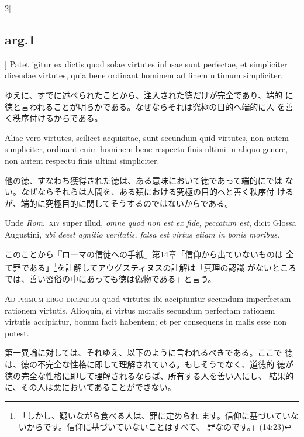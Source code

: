 \documentclass[paper=a4paper,fontsize=10pt,jafontsize=9pt,titlepage]{jlreq}
\begin{document}
\begin{paracol}{2}[\subsection{arg.1}]
Patet igitur ex dictis quod solae virtutes infusae sunt perfectae, et
 simpliciter dicendae virtutes, quia bene ordinant hominem ad finem
 ultimum simpliciter.

\switchcolumn

ゆえに、すでに述べられたことから、注入された徳だけが完全であり、端的
 に徳と言われることが明らかである。なぜならそれは究極の目的へ端的に人
 を善く秩序付けるからである。

\switchcolumn*

Aliae vero virtutes, scilicet acquisitae, sunt secundum quid
 virtutes, non autem simpliciter, ordinant enim hominem bene respectu
 finis ultimi in aliquo genere, non autem respectu finis ultimi
 simpliciter.

\switchcolumn

他の徳、すなわち獲得された徳は、ある意味において徳であって端的にでは
 ない。なぜならそれらは人間を、ある類における究極の目的へと善く秩序付
 けるが、端的に究極目的に関してそうするのではないからである。

\switchcolumn*

Unde {\itshape Rom}.~{\scshape xiv} super illud, {\itshape omne quod
 non est ex fide, peccatum est}, dicit Glossa Augustini, {\itshape ubi
 deest agnitio veritatis, falsa est virtus etiam in bonis moribus}.

\switchcolumn

このことから『ローマの信徒への手紙』第14章「信仰から出ていないものは
 全て罪である」\footnote{「しかし、疑いながら食べる人は、罪に定められ
 ます。信仰に基づいていないからです。信仰に基づいていないことはすべて、
 罪なのです。」(14:23)}を註解してアウグスティヌスの註解は「真理の認識
 がないところでは、善い習俗の中にあっても徳は偽物である」と言う。

\switchcolumn*[\subsection{ad.1}]

{\scshape Ad primum ergo dicendum} quod virtutes ibi accipiuntur
 secundum imperfectam rationem virtutis. Alioquin, si virtus moralis
 secundum perfectam rationem virtutis accipiatur, bonum facit
 habentem; et per consequens in malis esse non potest.

\switchcolumn

第一異論に対しては、それゆえ、以下のように言われるべきである。ここで
 徳は、徳の不完全な性格に即して理解されている。もしそうでなく、道徳的
 徳が徳の完全な性格に即して理解されるならば、所有する人を善い人にし、
 結果的に、その人は悪においてあることができない。


\end{paracol}
\end{document}
